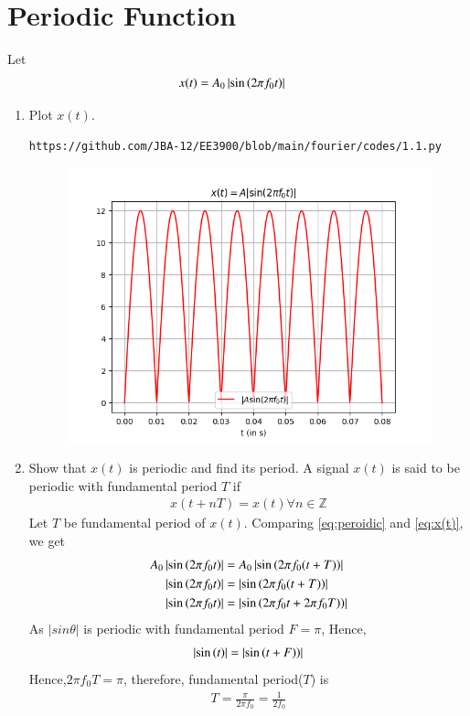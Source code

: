 \documentclass[journal,12pt,twocolumn]{IEEEtran}
\renewcommand\thesection{\arabic{section}}
\begin{document}
    \section{Periodic Function}
    Let 
    \begin{align}
        x(t) &= A_0\left\vert\sin\left(2\pi f_0 t\right)\right\vert
        \label{eq:x(t)}
    \end{align}
    \begin{enumerate}[label=\thesection.\arabic*
    ,ref=\thesection.\theenumi]
    \item Plot $x(t)$.\\
    \solution 
    \begin{lstlisting}
https://github.com/JBA-12/EE3900/blob/main/fourier/codes/1.1.py
    \end{lstlisting}
    \begin{figure}[!ht]
			\centering
			\includegraphics[width=\columnwidth]{./figs/1.1.png}
			\caption{}
\end{figure}
    \item Show that $x(t)$ is periodic and find its period.
    \solution 
    A signal $x(t)$ is said to be periodic with fundamental period $T$ if
    \begin{align}
    \label{eq:peroidic}
    x(t+nT)=x(t) \forall n \in \mathbb{Z}
    \end{align}
Let $T$ be fundamental period of $x(t)$. Comparing \eqref{eq:peroidic} and \eqref{eq:x(t)}, we get
	\begin{align}
A_0\left\vert\sin\left(2\pi f_0 t\right)\right\vert&=A_0\left\vert\sin\left(2\pi f_0 (t+T)\right)\right\vert\\
\left\vert\sin\left(2\pi f_0 t\right)\right\vert&=\left\vert\sin\left(2\pi f_0 (t+T)\right)\right\vert\\
\left\vert\sin\left(2\pi f_0 t\right)\right\vert&=\left\vert\sin\left(2\pi f_0 t+2\pi f_0 T)\right)\right\vert
	\end{align}
As $|sin\theta|$ is periodic with fundamental period $F=\pi$, Hence,
    \begin{align}
\left\vert\sin\left(t\right)\right\vert=\left\vert\sin\left(t+F)\right)\right\vert
\end{align}
Hence,$2\pi f_0  T=\pi$, therefore, fundamental period($T$) is 
\begin{align}
\label{eq:ftp}
T=\frac{\pi}{2 \pi f_0}=\frac{1}{2f_0}
    \end{align}
    \end{enumerate}
\end{document}
